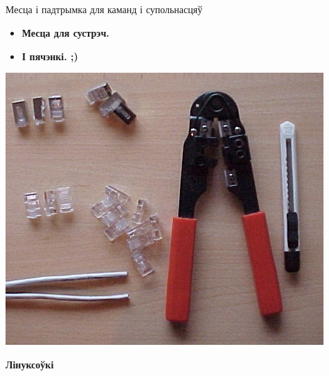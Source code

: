 \documentclass[ignorenonframetext,hyperref={pdftex,unicode}]{beamer}
\begin{document}
\subsection{}
\begin{frame}{Месца і падтрымка для каманд і супольнасцяў}
	\begin{itemize}
		\item \textbf{Месца для сустрэч.}
			\pause
		\item \textbf{І пячэнкі. ;)}
	\end{itemize}
	\begin{center}
		\includegraphics[width=\textwidth,height=0.8\textheight,keepaspectratio]{Utp_diy_tools}
	\end{center}
\end{frame}

		\item \textbf{Лінуксоўкі} 
			\pause
\end{document}
